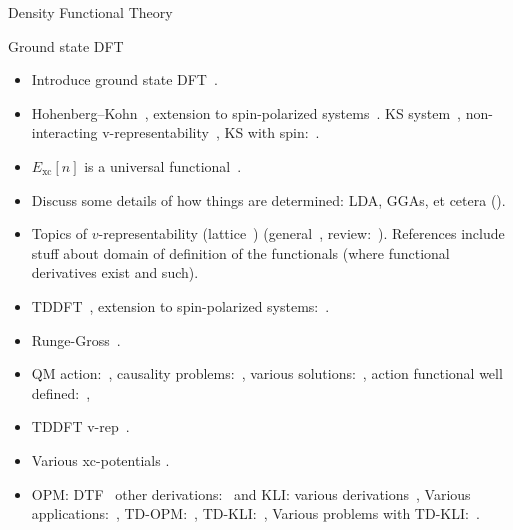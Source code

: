 \documentclass[letterpaper, 11 pt]{article}
\begin{document}
\begin{section}{Density Functional Theory \label{chap:dft}}
\begin{subsection}{Ground state DFT \label{sec:dft}}
   \end{subsection}

   \begin{itemize}

      \item Introduce ground state DFT~\cite[p. 61]{dft-engel}.

      \item Hohenberg–Kohn~\cite{hk-theorem}, extension to spin-polarized
         systems~\cite{spin-dep1, spin-dep2}. KS system~\cite{ks-eq}, non-interacting
         v-representability~\cite{nonint1, nonint2}, KS with spin:~\cite{spin-dep1, spin-dep3}.

      \item $E_\mathrm{xc}[n]$ is a universal functional~\cite{dft-engel}.

      \item Discuss some details of how things are determined: LDA, GGAs, et cetera
         ({\color{red}{still need this}}).

      \item Topics of $v$-representability (lattice~\cite{vrep-lat}) (general~\cite{vrep-levy1,
         vrep-levy2, vrep-lieb}, review:~\cite{vrep-rev}). References include stuff about domain of
         definition of the functionals (where functional derivatives exist and such).

      \item TDDFT~\cite{rgt, tddft, marques-1}, extension to spin-polarized systems:~\cite{td-spindep}.

      \item Runge-Gross~\cite{rgt}.

      \item QM action:~\cite{qmaction}, causality problems:~\cite{tddft-causality},
         various solutions:~\cite{caus-sol1, caus-sol2}, action functional well
         defined:~\cite{td-welldef}, 

      \item TDDFT v-rep~\cite{td-vrep}.

      \item Various xc-potentials {\color{red}{Add some refs?}}.

      \item OPM: DTF~\cite{opm1, opm2} other derivations:~\cite{opm3, opm4, opm5, opm-rev} and
         KLI: various derivations~\cite{kli1, kli2, kli3},
         Various applications:~\cite[p. 254]{dft-engel},
         TD-OPM:~\cite{tdopm}, TD-KLI:~\cite{tdkli1, tdkli2, tdkli3}, Various problems with
         TD-KLI:~\cite[p. 134-135]{tddft}.

   \end{itemize}

\end{section}
\end{document}
